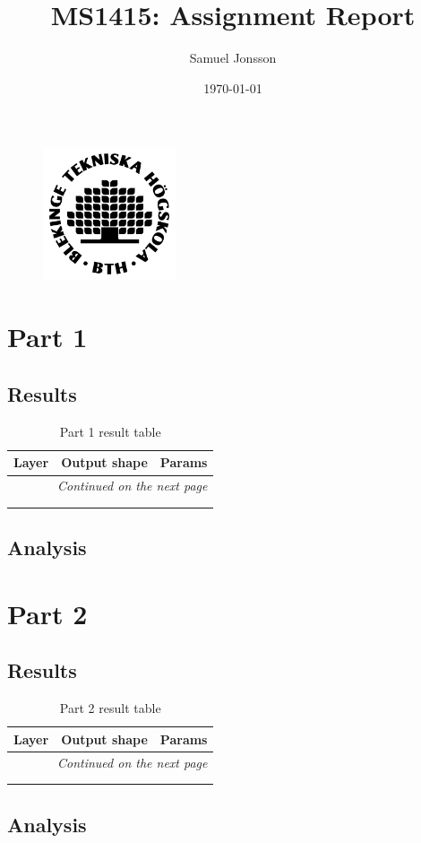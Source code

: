 \documentclass[12pt,a4paper,twoside]{article}
\author{Samuel Jonsson}
\date{\today}
\title{MS1415: Assignment Report}
\begin{document}
\maketitle

\begin{figure}[!b]
    \centering
    \includegraphics[width = 0.35\textwidth]{img/BTH_logo_black.png}
\end{figure}

\newpage

\section{Part 1}
\subsection{Results}
\begin{longtable}{l|p{}|p{}}
	\textbf{Layer} & \textbf{Output shape} & \textbf{Params} \\
	\hline
	\endhead
	\hline
	\multicolumn{3}{r}{\emph{Continued on the next page}}    \\
	\endfoot
	\hline
	\endlastfoot
	\hline
	 &  &  \\
     \caption{Part 1 result table}
     \label{tab:part1res}
\end{longtable}

\subsection{Analysis}

\section{Part 2}
\subsection{Results}
\begin{longtable}{l|p{}|p{}}
	\textbf{Layer} & \textbf{Output shape} & \textbf{Params} \\
	\hline
	\endhead
	\hline
	\multicolumn{3}{r}{\emph{Continued on the next page}}    \\
	\endfoot
	\hline
	\endlastfoot
	\hline
	 &  &  \\
	\caption{Part 2 result table}
	\label{tab:part2res}
\end{longtable}
\subsection{Analysis}
\end{document}
